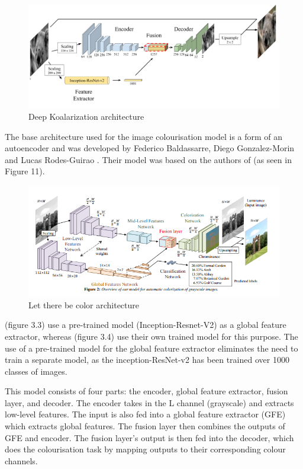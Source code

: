 \begin{figure}[H]
    \centering
    \includegraphics[width=1\columnwidth]{sections/figures/model.png}
    \caption{Deep Koalarization  architecture}
    \label{fig:my_label}
\end{figure}

The base architecture used for the image colourisation model is a form of an autoencoder and was developed by Federico Baldassarre, Diego Gonzalez-Morin and Lucas Rodes-Guirao \cite{deepkoal2017}. Their model was based on the authors of \cite{IizukaSIGGRAPH2016} (as seen in Figure 11).

\begin{figure}[H]
    \centering
    \includegraphics[width=0.8\columnwidth]{sections/figures/different_model.PNG}
    \caption{Let there be color architecture}
    \label{fig:my_label}
\end{figure}

\cite{deepkoal2017} (figure 3.3) use a pre-trained model (Inception-Resnet-V2) as a global feature extractor, whereas \cite{IizukaSIGGRAPH2016} (figure 3.4) use their own trained model for this purpose. The use of a pre-trained model for the global feature extractor eliminates the need to train a separate model, as the inception-ResNet-v2 has been trained over 1000 classes of images.

This model consists of four parts: the encoder, global feature extractor, fusion layer, and decoder. The encoder takes in the L channel (grayscale) and extracts low-level features. The input is also fed into a global feature extractor (GFE) which extracts global features. The fusion layer then combines the outputs of GFE and encoder. The fusion layer's output is then fed into the decoder, which does the colourisation task by mapping outputs to their corresponding colour channels.
 
